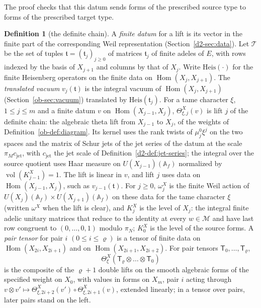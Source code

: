 \documentclass[reqno]{amsart}
\theoremstyle{definition}
\newtheorem{definition}{Definition}[section]
\theoremstyle{plain}
\newcommand{\Tc}{\mathcal{T}}
\newcommand{\Hom}{\operatorname{Hom}}
\begin{document}
The proof checks that this datum sends forms of the prescribed source type to forms of the prescribed target type.

\begin{definition}[the definite chain]\label{def:definite}
A \emph{finite datum} for a lift is its vector in the finite part of the corresponding Weil representation (Section~\ref{d2-sec:data}).  Let \(\Tc\) be the set of tuples \(\mathfrak t = (\mathfrak t_j)_{j \ge 0}\) of matrices \(\mathfrak t_j\) of finite adeles of \(E\), with rows indexed by the basis of \(X_{j+1}\) and columns by that of \(X_j\).  Write \(\mathrm{Heis}(\cdot)\) for the finite Heisenberg operators on the finite data on \(\Hom(X_j, X_{j+1})\).  The \emph{translated vacuum} \(v_j(\mathfrak t)\) is the integral vacuum of \(\Hom(X_j, X_{j+1})\) (Section~\ref{ob-sec:vacuum}) translated by \(\mathrm{Heis}(\mathfrak t_j)\).  For a tame character \(\xi\), \(1 \le j \le m\) and a finite datum \(v\) on \(\Hom(X_{j-1}, X_j)\), \(\Theta^X_{\xi,j}(v)\) is lift \(j\) of the definite chain: the algebraic theta lift from \(X_{j-1}\) to \(X_j\), of the weights of Definition~\ref{ob-def:diagram}.  Its kernel uses the rank twists of \(\mu_j^0\xi^j\) on the two spaces and the matrix of Schur jets of the jet series of the datum at the scale \(\pi_M c_{\mathrm{jet}}\), with \(c_{\mathrm{jet}}\) the jet scale of Definition~\ref{d2-def:jet-series}; the integral over the source quotient uses Haar measure on \(U(X_{j-1})(\mathbb A_f)\) normalized by \(\operatorname{vol}(K^X_{j-1})=1\).  The lift is linear in \(v\), and lift \(j\) uses data on \(\Hom(X_{j-1}, X_j)\), such as \(v_{j-1}(\mathfrak t)\).  For \(j \ge 0\), \(\omega^X_j\) is the finite Weil action of \(U(X_j)(\mathbb A_f) \times U(X_{j+1})(\mathbb A_f)\) on these data for the tame character \(\xi\) (written \(\omega^X\) when the lift is clear), and \(K^X_j\) is the level of \(X_j\): the integral finite adelic unitary matrices that reduce to the identity at every \(w \in \mathcal M\) and have last row congruent to \((0, \dots, 0, 1)\) modulo \(\pi_N\); \(K^X_0\) is the level of the source forms.  A \emph{pair tensor} for pair \(i\) \((0 \le i \le \varrho)\) is a tensor of finite data on \(\Hom(X_{2i}, X_{2i+1})\) and on \(\Hom(X_{2i+1}, X_{2i+2})\).  For pair tensors \(\mathsf T_0, \dots, \mathsf T_\varrho\),
\[
  \Theta^X_\xi(\mathsf T_\varrho \otimes \dots \otimes \mathsf T_0)
\]
is the composite of the \(\varrho + 1\) double lifts on the smooth algebraic forms of the specified weight on \(X_0\), with values in forms on \(X_m\), pair \(i\) acting through \(v \otimes v' \mapsto \Theta^X_{\xi,2i+2}(v') \circ \Theta^X_{\xi,2i+1}(v)\), extended linearly; in a tensor over pairs, later pairs stand on the left.
\end{definition}
\end{document}
